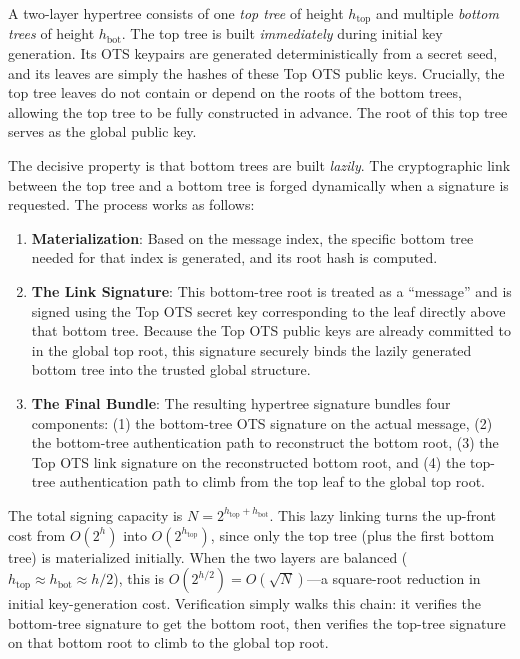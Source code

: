 \documentclass[10pt,a4paper,twocolumn]{article}
\begin{document}
A two-layer hypertree consists of one \emph{top tree} of height $h_{\text{top}}$ and multiple \emph{bottom trees} of height $h_{\text{bot}}$. The top tree is built \emph{immediately} during initial key generation. Its OTS keypairs are generated deterministically from a secret seed, and its leaves are simply the hashes of these Top OTS public keys. Crucially, the top tree leaves do not contain or depend on the roots of the bottom trees, allowing the top tree to be fully constructed in advance. The root of this top tree serves as the global public key.

The decisive property is that bottom trees are built \emph{lazily}. The cryptographic link between the top tree and a bottom tree is forged dynamically when a signature is requested. The process works as follows:
\begin{enumerate}
    \item \textbf{Materialization}: Based on the message index, the specific bottom tree needed for that index is generated, and its root hash is computed.
    \item \textbf{The Link Signature}: This bottom-tree root is treated as a ``message'' and is signed using the Top OTS secret key corresponding to the leaf directly above that bottom tree. Because the Top OTS public keys are already committed to in the global top root, this signature securely binds the lazily generated bottom tree into the trusted global structure.
    \item \textbf{The Final Bundle}: The resulting hypertree signature bundles four components: (1) the bottom-tree OTS signature on the actual message, (2) the bottom-tree authentication path to reconstruct the bottom root, (3) the Top OTS link signature on the reconstructed bottom root, and (4) the top-tree authentication path to climb from the top leaf to the global top root.
\end{enumerate}
The total signing capacity is $N = 2^{h_{\text{top}} + h_{\text{bot}}}$. This lazy linking turns the up-front cost from $O(2^h)$ into $O(2^{h_{\text{top}}})$, since only the top tree (plus the first bottom tree) is materialized initially. When the two layers are balanced ($h_{\text{top}} \approx h_{\text{bot}} \approx h/2$), this is $O(2^{h/2}) = O(\sqrt{N})$---a square-root reduction in initial key-generation cost. Verification simply walks this chain: it verifies the bottom-tree signature to get the bottom root, then verifies the top-tree signature on that bottom root to climb to the global top root.
\end{document}
